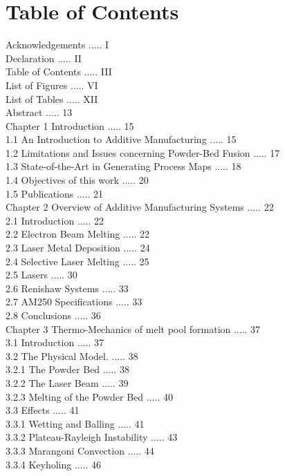 \documentclass[10pt]{article}
\begin{document}
\section*{Table of Contents}
Acknowledgements ..... I\\
Declaration ..... II\\
Table of Contents ..... III\\
List of Figures ..... $\mathrm{VI}$\\
List of Tables ..... XII\\
Abstract ..... 13\\
Chapter 1 Introduction ..... 15\\
1.1 An Introduction to Additive Manufacturing ..... 15\\
1.2 Limitations and Issues concerning Powder-Bed Fusion ..... 17\\
1.3 State-of-the-Art in Generating Process Maps ..... 18\\
1.4 Objectives of this work ..... 20\\
1.5 Publications ..... 21\\
Chapter 2 Overview of Additive Manufacturing Systems ..... 22\\
2.1 Introduction ..... 22\\
2.2 Electron Beam Melting ..... 22\\
2.3 Laser Metal Deposition ..... 24\\
2.4 Selective Laser Melting ..... 25\\
2.5 Lasers ..... 30\\
2.6 Renishaw Systems ..... 33\\
2.7 AM250 Specifications ..... 33\\
2.8 Conclusions ..... 36\\
Chapter 3 Thermo-Mechanics of melt pool formation ..... 37\\
3.1 Introduction ..... 37\\
3.2 The Physical Model. ..... 38\\
3.2.1 The Powder Bed ..... 38\\
3.2.2 The Laser Beam ..... 39\\
3.2.3 Melting of the Powder Bed ..... 40\\
3.3 Effects ..... 41\\
3.3.1 Wetting and Balling ..... 41\\
3.3.2 Plateau-Rayleigh Instability ..... 43\\
3.3.3 Marangoni Convection ..... 44\\
3.3.4 Keyholing ..... 46\\
\end{document}
